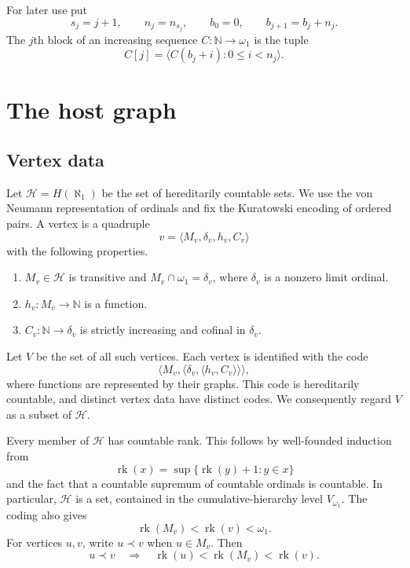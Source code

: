 \documentclass[11pt,leqno]{amsart}
\theoremstyle{definition}
\numberwithin{equation}{section}
\newcommand{\N}{\mathbb N}
\newcommand{\HH}{\mathcal H}
\newcommand{\rk}{\operatorname{rk}}
\newcommand{\seq}[1]{\langle #1\rangle}
\begin{document}
For later use put
\begin{equation}\label{eq:blocks}
s_j=j+1,\qquad n_j=n_{s_j},\qquad
b_0=0,\qquad b_{j+1}=b_j+n_j.
\end{equation}
The $j$th block of an increasing sequence $C\colon\N\to\omega_1$ is the tuple
\[
C[j]=\seq{C(b_j+i):0\le i<n_j}.
\]

\section{The host graph}

\subsection{Vertex data}
Let $\HH=H(\aleph_1)$ be the set of hereditarily countable sets. We use the von Neumann representation of ordinals and fix the Kuratowski encoding of ordered pairs. A vertex is a quadruple
\begin{equation}\label{eq:vertex}
v=\seq{M_v,\delta_v,h_v,C_v}
\end{equation}
with the following properties.
\begin{enumerate}
\item $M_v\in\HH$ is transitive and $M_v\cap\omega_1=\delta_v$, where $\delta_v$ is a nonzero limit ordinal.
\item $h_v\colon M_v\to\N$ is a function.
\item $C_v\colon\N\to\delta_v$ is strictly increasing and cofinal in $\delta_v$.
\end{enumerate}
Let $V$ be the set of all such vertices. Each vertex is identified with the code
\[
\seq{M_v,\seq{\delta_v,\seq{h_v,C_v}}},
\]
where functions are represented by their graphs. This code is hereditarily countable, and distinct vertex data have distinct codes. We consequently regard $V$ as a subset of $\HH$.

Every member of $\HH$ has countable rank. This follows by well-founded induction from
\[
\rk(x)=\sup\{\rk(y)+1:y\in x\}
\]
and the fact that a countable supremum of countable ordinals is countable. In particular, $\HH$ is a set, contained in the cumulative-hierarchy level $V_{\omega_1}$. The coding also gives
\begin{equation}\label{eq:rank}
\rk(M_v)<\rk(v)<\omega_1.
\end{equation}
For vertices $u,v$, write $u\prec v$ when $u\in M_v$. Then
\begin{equation}\label{eq:precedes}
u\prec v\quad\Longrightarrow\quad \rk(u)<\rk(M_v)<\rk(v).
\end{equation}
\end{document}
